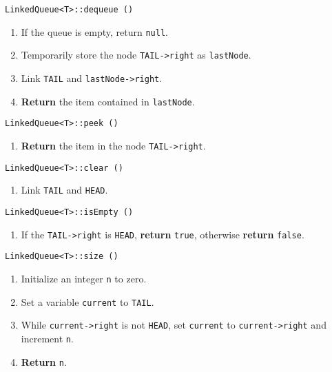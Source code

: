\texttt{LinkedQueue<T>::dequeue ()}
\begin{enumerate}
	\item If the queue is empty, return \texttt{null}.
	\item Temporarily store the node \texttt{TAIL->right} as \texttt{lastNode}.
	\item Link \texttt{TAIL} and \texttt{lastNode->right}. 
	\item \textbf{Return} the item contained in \texttt{lastNode}. 
\end{enumerate}
\vspace{5mm}
\texttt{LinkedQueue<T>::peek ()}
\begin{enumerate}
	\item \textbf{Return} the item in the node \texttt{TAIL->right}.
\end{enumerate}
\vspace{5mm}
\texttt{LinkedQueue<T>::clear ()}
\begin{enumerate}
	\item Link \texttt{TAIL} and \texttt{HEAD}.
\end{enumerate}
\vspace{5mm}
\texttt{LinkedQueue<T>::isEmpty ()}
\begin{enumerate}
	\item If the \texttt{TAIL->right} is \texttt{HEAD}, \textbf{return} \texttt{true}, otherwise \textbf{return} \texttt{false}.
\end{enumerate}
\vspace{5mm}
\texttt{LinkedQueue<T>::size ()}
\begin{enumerate}
	\item Initialize an integer \texttt{n} to zero.
	\item Set a variable \texttt{current} to \texttt{TAIL}.
	\item While \texttt{current->right} is not \texttt{HEAD}, set \texttt{current} to \texttt{current->right} and increment \texttt{n}.
	\item \textbf{Return} \texttt{n}.
\end{enumerate}

\sourcecode




